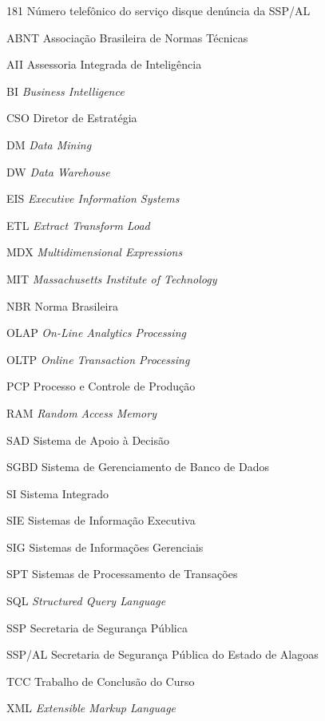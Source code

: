 %
%

\begin{siglas}
	\setlength{\baselineskip}{0.7\baselineskip}
	
    \item[181] Número telefônico do serviço disque denúncia da SSP/AL
    \item[ABNT] Associação Brasileira de Normas Técnicas
    \item[AII] Assessoria Integrada de Inteligência
    \item[BI] \textit{Business Intelligence}
    \item[CSO] Diretor de Estratégia
    \item[DM] \textit{Data Mining}
    \item[DW] \textit{Data Warehouse}
    \item[EIS] \textit{Executive Information Systems}
    \item[ETL] \textit{Extract Transform Load}
    \item[MDX] \textit{Multidimensional Expressions}
    \item[MIT] \textit{Massachusetts Institute of Technology}
    \item[NBR] Norma Brasileira
    \item[OLAP] \textit{On-Line Analytics Processing}
    \item[OLTP] \textit{Online Transaction Processing}
    \item[PCP] Processo e Controle de Produção
    \item[RAM] \textit{Random Access Memory}
    \item[SAD] Sistema de Apoio à Decisão
    \item[SGBD] Sistema de Gerenciamento de Banco de Dados
    \item[SI] Sistema Integrado
    \item[SIE] Sistemas de Informação Executiva
    \item[SIG] Sistemas de Informações Gerenciais
    \item[SPT] Sistemas de Processamento de Transações
    \item[SQL] \textit{Structured Query Language}
    \item[SSP] Secretaria de Segurança Pública
    \item[SSP/AL] Secretaria de Segurança Pública do Estado de Alagoas
    \item[TCC] Trabalho de Conclusão do Curso
    \item[XML] \textit{Extensible Markup Language}
    
\end{siglas}
